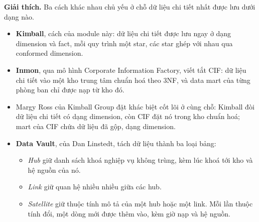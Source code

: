 \textbf{Giải thích.} Ba cách khác nhau chủ yếu ở chỗ dữ liệu chi tiết nhất được lưu dưới dạng nào.
\begin{itemize}
  \item \textbf{Kimball}, cách của module này: dữ liệu chi tiết được lưu ngay ở dạng dimension và fact, mỗi quy trình một star, các star ghép với nhau qua conformed dimension.
  \item \textbf{Inmon}, qua mô hình Corporate Information Factory, viết tắt CIF: dữ liệu chi tiết vào một kho trung tâm chuẩn hoá theo 3NF, và data mart của từng phòng ban chỉ được nạp từ kho đó.
  \item Margy Ross của Kimball Group đặt khác biệt cốt lõi ở cùng chỗ: Kimball đòi dữ liệu chi tiết có dạng dimension, còn CIF đặt nó trong kho chuẩn hoá; mart của CIF chứa dữ liệu đã gộp, dạng dimension.
  \item \textbf{Data Vault}, của Dan Linstedt, tách dữ liệu thành ba loại bảng:
  \begin{itemize}
    \item \textit{Hub} giữ danh sách khoá nghiệp vụ không trùng, kèm lúc khoá tới kho và hệ nguồn của nó.
    \item \textit{Link} giữ quan hệ nhiều nhiều giữa các hub.
    \item \textit{Satellite} giữ thuộc tính mô tả của một hub hoặc một link. Mỗi lần thuộc tính đổi, một dòng mới được thêm vào, kèm giờ nạp và hệ nguồn.
  \end{itemize}
\end{itemize}

